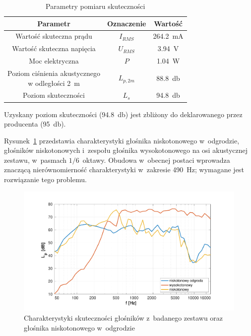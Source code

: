 \documentclass[12pt]{oska}
\begin{document}
	\begin{table}[!ht]
		\centering
		\caption{Parametry pomiaru skuteczności}
		\label{t:skutecznosc}
		\begin{tabular}{|c|c|c|}
			\hline
			\textbf{Parametr} & \textbf{Oznaczenie} & \textbf{Wartość} \\\hline
			Wartość skuteczna prądu & $I_{RMS}$ & \SI{264,2}{\milli\ampere} \\\hline
			Wartość skuteczna napięcia & $U_{RMS}$ & \SI{3,94}{\volt} \\\hline
			Moc elektryczna & $P$ & \SI{1,04}{\watt} \\\hline
			\makecell{Poziom ciśnienia akustycznego\\w odległości \SI{2}{\metre}} & $L_{p,2m}$ & \SI{88,8}{\decibel} \\\hline
			Poziom skuteczności & $L_{s}$ & \SI{94,8}{\decibel} \\\hline
		\end{tabular}
	\end{table}
	
	Uzyskany poziom skuteczności (\SI{94,8}{\decibel}) jest zbliżony do deklarowanego przez producenta (\SI{95}{\decibel}).
	
	Rysunek~\ref{r:skutecznosc} przedstawia charakterystyki głośnika niskotonowego w~odgrodzie, głośników niskotonowych i~zespołu głośnika wysokotonowego na osi akustycznej zestawu, w~pasmach $1/6$~oktawy. Obudowa w~obecnej postaci wprowadza znaczącą nierównomierność charakterystyki w~zakresie \SI{490}{\hertz}; wymagane jest rozwiązanie tego problemu.
	
	\begin{figure}[!ht]
		\centering
		\includegraphics[width=.8\textwidth,trim={2cm .5cm 2cm 1cm},clip]{skutecznosci_stolik.pdf}
		\caption{Charakterystyki skuteczności głośników z~badanego zestawu oraz głośnika niskotonowego w~odgrodzie}
		\label{r:skutecznosc}
	\end{figure}
	
\end{document}
